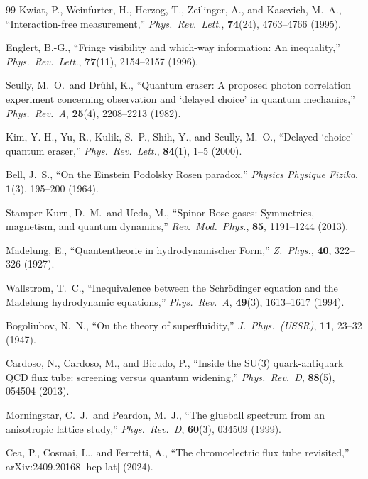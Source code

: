 ﻿\documentclass[12pt,letterpaper]{article}
\begin{document}
\begin{thebibliography}{99}
Kwiat, P., Weinfurter, H., Herzog, T., Zeilinger, A., and Kasevich, M.~A.,
``Interaction-free measurement,''
\textit{Phys.\ Rev.\ Lett.}, \textbf{74}(24), 4763--4766 (1995).


Englert, B.-G.,
``Fringe visibility and which-way information: An inequality,''
\textit{Phys.\ Rev.\ Lett.}, \textbf{77}(11), 2154--2157 (1996).


Scully, M.~O.\ and Dr\"uhl, K.,
``Quantum eraser: A proposed photon correlation experiment concerning observation and `delayed choice' in quantum mechanics,''
\textit{Phys.\ Rev.\ A}, \textbf{25}(4), 2208--2213 (1982).


Kim, Y.-H., Yu, R., Kulik, S.~P., Shih, Y., and Scully, M.~O.,
``Delayed `choice' quantum eraser,''
\textit{Phys.\ Rev.\ Lett.}, \textbf{84}(1), 1--5 (2000).


Bell, J.~S.,
``On the Einstein Podolsky Rosen paradox,''
\textit{Physics Physique Fizika}, \textbf{1}(3), 195--200 (1964).


Stamper-Kurn, D.~M.\ and Ueda, M.,
``Spinor Bose gases: Symmetries, magnetism, and quantum dynamics,''
\textit{Rev.\ Mod.\ Phys.}, \textbf{85}, 1191--1244 (2013).


Madelung, E.,
``Quantentheorie in hydrodynamischer Form,''
\textit{Z.\ Phys.}, \textbf{40}, 322--326 (1927).


Wallstrom, T.~C.,
``Inequivalence between the Schr\"odinger equation and the Madelung hydrodynamic equations,''
\textit{Phys.\ Rev.\ A}, \textbf{49}(3), 1613--1617 (1994).


Bogoliubov, N.~N.,
``On the theory of superfluidity,''
\textit{J.\ Phys.\ (USSR)}, \textbf{11}, 23--32 (1947).


Cardoso, N., Cardoso, M., and Bicudo, P.,
``Inside the SU(3) quark-antiquark QCD flux tube: screening versus quantum widening,''
\textit{Phys.\ Rev.\ D}, \textbf{88}(5), 054504 (2013).


Morningstar, C.~J.\ and Peardon, M.~J.,
``The glueball spectrum from an anisotropic lattice study,''
\textit{Phys.\ Rev.\ D}, \textbf{60}(3), 034509 (1999).


Cea, P., Cosmai, L., and Ferretti, A.,
``The chromoelectric flux tube revisited,''
arXiv:2409.20168 [hep-lat] (2024).



\end{thebibliography}
\end{document}
